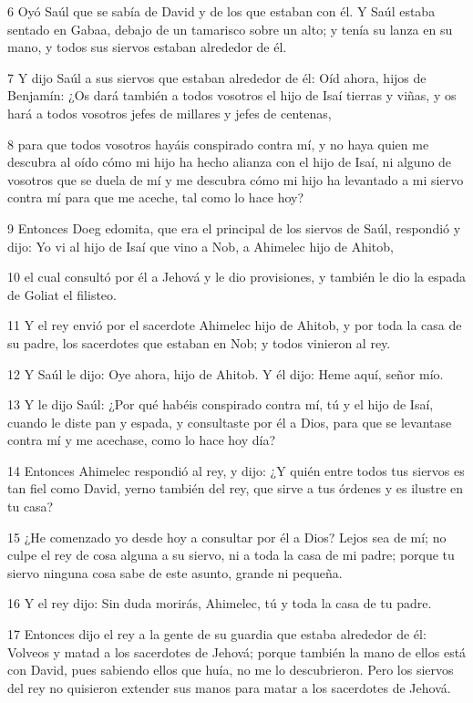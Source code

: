 \par 6 Oyó Saúl que se sabía de David y de los que estaban con él. Y Saúl estaba sentado en Gabaa, debajo de un tamarisco sobre un alto; y tenía su lanza en su mano, y todos sus siervos estaban alrededor de él.
\par 7 Y dijo Saúl a sus siervos que estaban alrededor de él: Oíd ahora, hijos de Benjamín: ¿Os dará también a todos vosotros el hijo de Isaí tierras y viñas, y os hará a todos vosotros jefes de millares y jefes de centenas,
\par 8 para que todos vosotros hayáis conspirado contra mí, y no haya quien me descubra al oído cómo mi hijo ha hecho alianza con el hijo de Isaí, ni alguno de vosotros que se duela de mí y me descubra cómo mi hijo ha levantado a mi siervo contra mí para que me aceche, tal como lo hace hoy?
\par 9 Entonces Doeg edomita, que era el principal de los siervos de Saúl, respondió y dijo: Yo vi al hijo de Isaí que vino a Nob, a Ahimelec hijo de Ahitob,
\par 10 el cual consultó por él a Jehová y le dio provisiones, y también le dio la espada de Goliat el filisteo. 
\par 11 Y el rey envió por el sacerdote Ahimelec hijo de Ahitob, y por toda la casa de su padre, los sacerdotes que estaban en Nob; y todos vinieron al rey.
\par 12 Y Saúl le dijo: Oye ahora, hijo de Ahitob. Y él dijo: Heme aquí, señor mío.
\par 13 Y le dijo Saúl: ¿Por qué habéis conspirado contra mí, tú y el hijo de Isaí, cuando le diste pan y espada, y consultaste por él a Dios, para que se levantase contra mí y me acechase, como lo hace hoy día?
\par 14 Entonces Ahimelec respondió al rey, y dijo: ¿Y quién entre todos tus siervos es tan fiel como David, yerno también del rey, que sirve a tus órdenes y es ilustre en tu casa?
\par 15 ¿He comenzado yo desde hoy a consultar por él a Dios? Lejos sea de mí; no culpe el rey de cosa alguna a su siervo, ni a toda la casa de mi padre; porque tu siervo ninguna cosa sabe de este asunto, grande ni pequeña.
\par 16 Y el rey dijo: Sin duda morirás, Ahimelec, tú y toda la casa de tu padre.
\par 17 Entonces dijo el rey a la gente de su guardia que estaba alrededor de él: Volveos y matad a los sacerdotes de Jehová; porque también la mano de ellos está con David, pues sabiendo ellos que huía, no me lo descubrieron. Pero los siervos del rey no quisieron extender sus manos para matar a los sacerdotes de Jehová.
